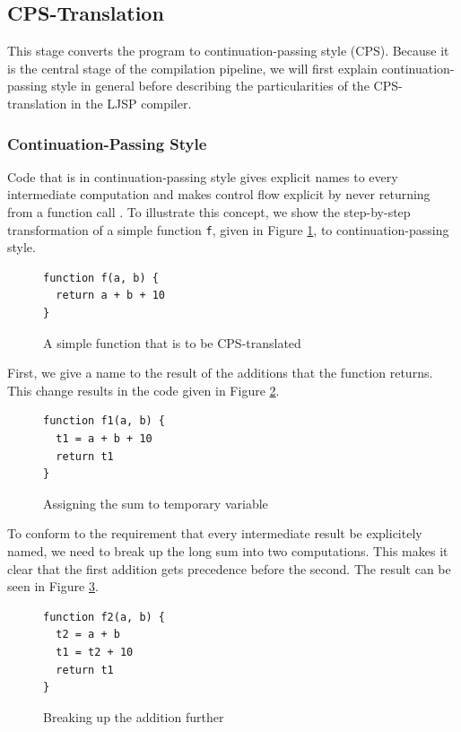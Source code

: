 \documentclass[11pt]{report}
\begin{document}
\subsection{CPS-Translation}
This stage converts the program to continuation-passing style (CPS). Because it is the central stage of the compilation pipeline, we will first explain continuation-passing style in general before describing the particularities of the CPS-translation in the LJSP compiler.

\subsubsection{Continuation-Passing Style}
Code that is in continuation-passing style gives explicit names to every intermediate computation and makes control flow explicit by never returning from a function call \cite{sysftal, appel}. To illustrate this concept, we show the step-by-step transformation of a simple function \texttt{f}, given in Figure \ref{cpsconvfunc1}, to continuation-passing style.

\begin{figure}[ht]
\begin{lstlisting}
function f(a, b) {
  return a + b + 10
}
\end{lstlisting}
\caption{A simple function that is to be CPS-translated}
\label{cpsconvfunc1}
\end{figure}

First, we give a name to the result of the additions that the function returns. This change results in the code given in Figure \ref{cpsconvfunc2}.

\begin{figure}[ht]
\begin{lstlisting}
function f1(a, b) {
  t1 = a + b + 10
  return t1
}
\end{lstlisting}
\caption{Assigning the sum to temporary variable}
\label{cpsconvfunc2}
\end{figure}

To conform to the requirement that every intermediate result be explicitely named, we need to break up the long sum into two computations. This makes it clear that the first addition gets precedence before the second. The result can be seen in Figure \ref{cpsconvfunc3}.

\begin{figure}[ht]
\begin{lstlisting}
function f2(a, b) {
  t2 = a + b
  t1 = t2 + 10
  return t1
}
\end{lstlisting}
\caption{Breaking up the addition further}
\label{cpsconvfunc3}
\end{figure}
\end{document}
